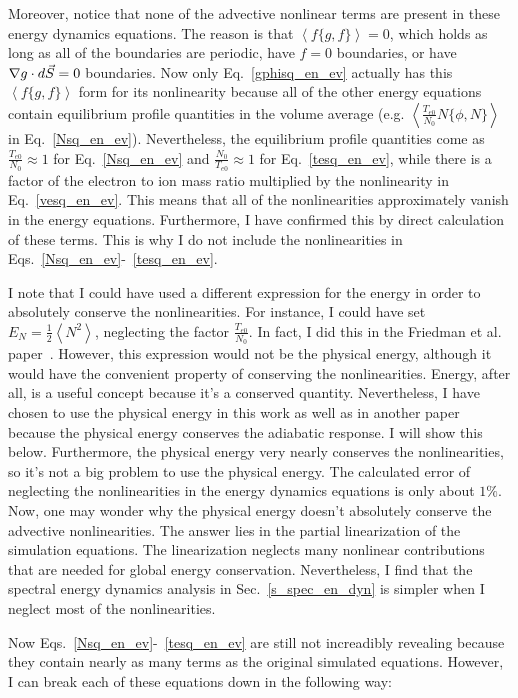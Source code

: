 Moreover, notice that none of the advective nonlinear terms are present in these energy dynamics equations. 
The reason is that $\left< f \{ g,f \} \right> = 0$, which holds as long as all of the boundaries are periodic, have $f=0$ boundaries, or have $\nabla g \cdot d\vec{S} = 0$ boundaries.
Now only Eq.~\ref{gphisq_en_ev} actually has this $\left< f \{ g,f \} \right> $ form for its nonlinearity
because all of the other energy equations contain equilibrium profile quantities in the volume average (e.g. $\left< \frac{T_{e0}}{N_0} N \{ \phi,N \} \right>$ in Eq.~\ref{Nsq_en_ev}).
Nevertheless, the equilibrium profile quantities come as $\frac{T_{e0}}{N_0} \approx 1$ for Eq.~\ref{Nsq_en_ev} and $\frac{N_0}{T_{e0}} \approx 1$ for Eq.~\ref{tesq_en_ev},
while there is a factor of the electron to ion mass ratio multiplied by the nonlinearity in Eq.~\ref{vesq_en_ev}. This means that all of the nonlinearities approximately vanish
in the energy equations. Furthermore, I have confirmed this by direct calculation of these terms. This is why I do not include the nonlinearities in Eqs.~\ref{Nsq_en_ev}-~\ref{tesq_en_ev}.

I note that I could have used a different expression for the energy in order to absolutely conserve the nonlinearities. For instance, I could have set $E_N = \frac{1}{2} \left< N^2 \right>$,
neglecting the factor $\frac{T_{e0}}{N_0}$. In fact, I did this in the Friedman et al. paper~\cite{friedman2012b}.
However, this expression would not be the physical energy, although it would have the convenient property of conserving the nonlinearities. 
Energy, after all, is a useful concept because it's a conserved quantity. Nevertheless, I have chosen to use the physical energy in this work as well as in another paper~\cite{friedman2013}
because the physical energy conserves the adiabatic response. I will show this below. Furthermore, the physical energy very nearly conserves the nonlinearities, 
so it's not a big problem to use the physical energy. The calculated error of neglecting the nonlinearities in the energy dynamics equations is only about $1 \%$.
Now, one may wonder why the physical energy doesn't absolutely conserve the advective nonlinearities. The answer
lies in the partial linearization of the simulation equations. The linearization neglects many nonlinear contributions that are needed for global energy conservation. Nevertheless, I find
that the spectral energy dynamics analysis in Sec.~\ref{s_spec_en_dyn} is simpler when I neglect most of the nonlinearities.

Now Eqs.~\ref{Nsq_en_ev}-~\ref{tesq_en_ev} are still not increadibly revealing because they contain nearly as many terms as the original simulated equations. However, I can break each
of these equations down in the following way:

